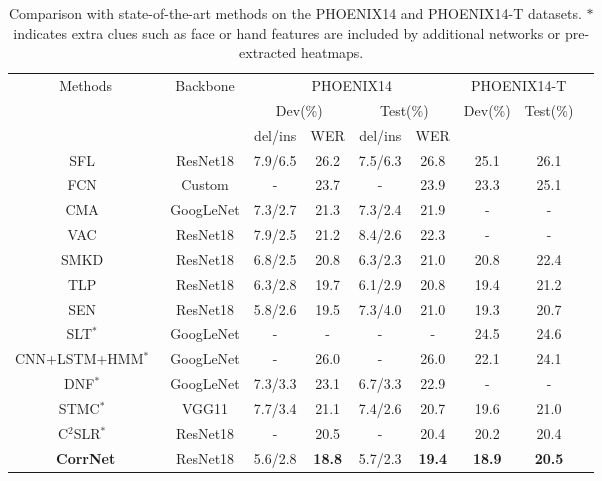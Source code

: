 \documentclass[10pt,twocolumn,letterpaper]{article}
\begin{document}
\begin{table*}[t]   
  \centering
  \setlength\tabcolsep{3pt}
  \begin{tabular}{ccccccccc}
  \hline
  \multirow{3}{*}{Methods} &\multirow{3}{*}{Backbone} & \multicolumn{4}{c}{PHOENIX14} & \multicolumn{2}{c}{PHOENIX14-T} \\
  & &\multicolumn{2}{c}{Dev(\%)} & \multicolumn{2}{c}{Test(\%)} &  \multirow{2}{*}{Dev(\%)} & \multirow{2}{*}{Test(\%)}\\
  & &del/ins & WER & del/ins& WER & & \\
  \hline
SFL~\cite{niu2020stochastic}& ResNet18 & 7.9/6.5 & 26.2 & 7.5/6.3& 26.8 & 25.1&26.1\\
FCN~\cite{cheng2020fully}& Custom & - & 23.7 & -& 23.9 & 23.3& 25.1\\
  CMA~\cite{pu2020boosting} & GoogLeNet & 7.3/2.7 & 21.3 & 7.3/2.4 & 21.9  & -&-\\
  VAC~\cite{Min_2021_ICCV}& ResNet18 & 7.9/2.5 & 21.2 &8.4/2.6 & 22.3 &- &-\\
  SMKD~\cite{hao2021self}& ResNet18 &6.8/2.5 &20.8 &6.3/2.3 & 21.0 & 20.8 & 22.4\\
  TLP~\cite{hu2022temporal} & ResNet18 & 6.3/2.8 & 19.7 & 6.1/2.9 & 20.8 & 19.4  & 21.2 \\
  SEN~\cite{hu2023self} & ResNet18 & 5.8/2.6 &  19.5 &  7.3/4.0 &  21.0 &  19.3 &  20.7 \\
  \hline
  SLT$^*$~\cite{camgoz2018neural}& GoogLeNet  & - & - & - & - & 24.5 & 24.6\\
  CNN+LSTM+HMM$^*$~\cite{koller2019weakly}& GoogLeNet  & - &26.0 & - & 26.0 & 22.1 & 24.1 \\
  DNF$^*$~\cite{cui2019deep}& GoogLeNet  & 7.3/3.3 &23.1& 6.7/3.3 & 22.9 & - & -\\
  STMC$^*$~\cite{zhou2020spatial}& VGG11 & 7.7/3.4 &21.1 & 7.4/2.6 & 20.7 & 19.6 & 21.0\\
  C$^2$SLR$^*$~\cite{zuo2022c2slr} & ResNet18 & - & 20.5 &- & 20.4 & 20.2 & 20.4  \\
  \hline
\textbf{CorrNet } & ResNet18 & 5.6/2.8  &\textbf{18.8} &   5.7/2.3 & \textbf{19.4}  & \textbf{18.9} & \textbf{20.5} \\
  \hline   
  \end{tabular}  
  \caption{Comparison with state-of-the-art methods on the PHOENIX14 and PHOENIX14-T datasets. $*$ indicates extra clues such as face or hand features are included by additional networks or pre-extracted heatmaps.} 
  \label{tab8}
\end{table*}
\end{document}
